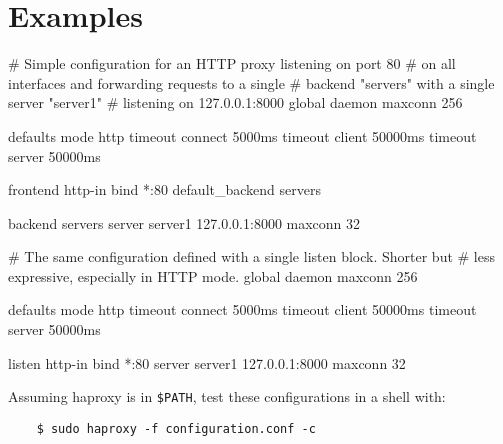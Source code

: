 
\pagebreak[3]
\section{Examples}

\begin{listing}{1}
# Simple configuration for an HTTP proxy listening on port 80
# on all interfaces and forwarding requests to a single 
# backend "servers" with a single server "server1"
# listening on 127.0.0.1:8000
global
    daemon
    maxconn 256

defaults
    mode http
    timeout connect 5000ms
    timeout client 50000ms
    timeout server 50000ms

frontend http-in
    bind *:80
    default_backend servers

backend servers
    server server1 127.0.0.1:8000 maxconn 32
\end{listing}

\pagebreak[4]
\begin{listing}{1}
# The same configuration defined with a single listen block. Shorter but
# less expressive, especially in HTTP mode.
global
    daemon
    maxconn 256

defaults
    mode http
    timeout connect 5000ms
    timeout client 50000ms
    timeout server 50000ms

listen http-in
    bind *:80
    server server1 127.0.0.1:8000 maxconn 32
\end{listing}

Assuming haproxy is in \verb|$PATH|, test these configurations in a shell with:
\begin{verbatim}
    $ sudo haproxy -f configuration.conf -c
\end{verbatim}
